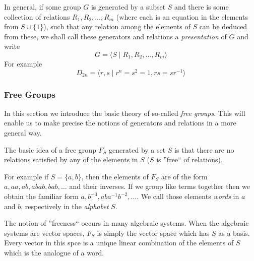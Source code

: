 In general, if some group \(G\) is generated by a subset \(S\) and there is some collection of relations \(R_1, R_2, \ldots, R_m\) (where each is an equation in the elements from \(S \cup \{1\}\)), such that any relation among the elements of \(S\) can be deduced from these, we shall call these generators and relations a \emph{presentation} of \(G\) and write
\[G = \langle S \mid R_1, R_2, \ldots, R_m \rangle\]
For example
\[D_{2n} = \langle r, s \mid r^n = s^2 = 1, rs = sr^{-1}\rangle\]

\subsubsection{Free Groups}
In this section we introduce the basic theory of so-called \emph{free groups}.
This will enable us to make precise the notions of generators and relations in a more general way.

The basic idea of a free group \(F_S\) generated by a set \(S\) is that there are no relations satisfied by any of the elements in \(S\) (\(S\) is ''free`` of relations).

For example if \(S = \{a, b\}\), then the elements of \(F_S\) are of the form \(a, aa, ab, abab, bab, \ldots\) and their inverses.
If we group like terms together then we obtain the familiar form \(a, b^{-3}, aba^{-1}b^{-2}, \ldots\).
We call those elements \emph{words} in \(a\) and \(b\), respectively in the \emph{alphabet} \(S\).

The notion of ''freeness`` occurs in many algebraic systems.
When the algebraic systems are vector spaces, \(F_S\) is simply the vector space which has \(S\) as a basis.
Every vector in this spce is a unique linear combination of the elements of \(S\) which is the analogue of a word.

